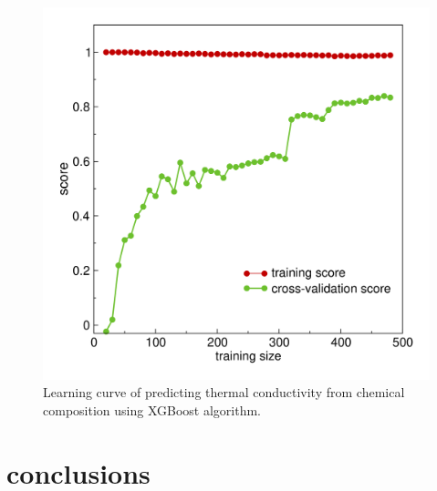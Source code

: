 \documentclass[10pt,aps,prb,amsmath,amssymb,twocolumn,letterpaper,nobalancelastpage,final,citeautoscript,floatfix,raggedbottom,superscriptaddress]{revtex4-1}
\begin{document}
\begin{figure}[h]
  \center
  \vspace{-1mm}
 \includegraphics[width=0.95\linewidth]{figures/learning_curve.png}
  \caption{Learning curve of predicting thermal conductivity from chemical composition using XGBoost algorithm.}
  \label{fig:wyq4}
\end{figure}



\section{conclusions}



%
\end{document}
